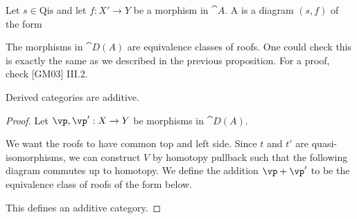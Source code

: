 \par
Let $s\in\text{Qis}$ and let $f:X'\to Y$ be a morphism in $\cat{A}$. A  is a diagram $(s,f)$ of the form 
\begin{center}
\end{center}
The morphisms in $\cat{D(A)}$ are equivalence classes of roofs. One could check this is exactly the same as we described in the previous proposition. For a proof, check [GM03] III.2.
\begin{proposition}
    Derived categories are additive.
\end{proposition}
\begin{proof}
    Let $\vp,\vp':X\to Y$ be morphisms in $\cat{D(A)}$. 
    \begin{center}
        \hspace{2.5cm}
    \end{center}
    We want the roofs to have common top and left side. Since $t$ and $t'$ are quasi-isomorphisms, we can construct $V$ by homotopy pullback such that the following diagram commutes up to homotopy. We define the addition $\vp+\vp'$ to be the equivalence class of roofs of the form below.
    \begin{center}
        \hspace{2.5cm}
    \end{center}
    This defines an additive category.
\end{proof}
